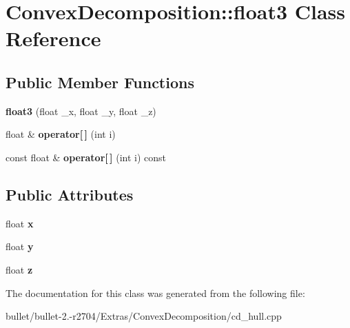 \hypertarget{class_convex_decomposition_1_1float3}{\section{Convex\+Decomposition\+:\+:float3 Class Reference}
\label{class_convex_decomposition_1_1float3}
}
\subsection*{Public Member Functions}
\begin{DoxyCompactItemize}
\item 
\hypertarget{class_convex_decomposition_1_1float3_a4945dd0cf7f9983f7cb233d185d14038}{{\bfseries float3} (float \+\_\+x, float \+\_\+y, float \+\_\+z)}\label{class_convex_decomposition_1_1float3_a4945dd0cf7f9983f7cb233d185d14038}

\item 
\hypertarget{class_convex_decomposition_1_1float3_a28b553c630e051d6152290c47fa17fc5}{float \& {\bfseries operator\mbox{[}$\,$\mbox{]}} (int i)}\label{class_convex_decomposition_1_1float3_a28b553c630e051d6152290c47fa17fc5}

\item 
\hypertarget{class_convex_decomposition_1_1float3_a645dc2b67e3099bcdf0590bd5e69d7ac}{const float \& {\bfseries operator\mbox{[}$\,$\mbox{]}} (int i) const }\label{class_convex_decomposition_1_1float3_a645dc2b67e3099bcdf0590bd5e69d7ac}

\end{DoxyCompactItemize}
\subsection*{Public Attributes}
\begin{DoxyCompactItemize}
\item 
\hypertarget{class_convex_decomposition_1_1float3_ae8cddffe0292fafdff24b4f42cb12e2d}{float {\bfseries x}}\label{class_convex_decomposition_1_1float3_ae8cddffe0292fafdff24b4f42cb12e2d}

\item 
\hypertarget{class_convex_decomposition_1_1float3_a90bceed7203db0375119a9be0dcf37e0}{float {\bfseries y}}\label{class_convex_decomposition_1_1float3_a90bceed7203db0375119a9be0dcf37e0}

\item 
\hypertarget{class_convex_decomposition_1_1float3_a723b93763a2026594533971913abf552}{float {\bfseries z}}\label{class_convex_decomposition_1_1float3_a723b93763a2026594533971913abf552}

\end{DoxyCompactItemize}


The documentation for this class was generated from the following file\+:\begin{DoxyCompactItemize}
\item 
bullet/bullet-\/2.-\/r2704/\+Extras/\+Convex\+Decomposition/cd\+\_\+hull.\+cpp\end{DoxyCompactItemize}
